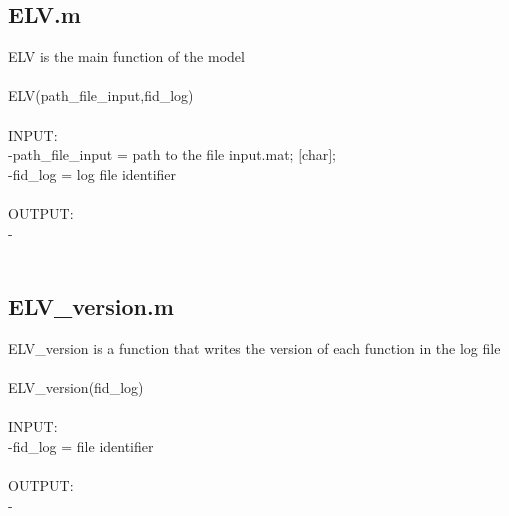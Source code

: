 \subsection{ELV.m}
ELV is the main function of the model \\ 
 \\ 
ELV(path\_file\_input,fid\_log) \\ 
 \\ 
INPUT: \\ 
   -path\_file\_input = path to the file input.mat; $[$char$]$;  \\ 
	-fid\_log = log file identifier \\ 
 \\ 
OUTPUT: \\ 
   - \\ 
 \\ 
\subsection{ELV\_version.m}
ELV\_version is a function that writes the version of each function in the log file \\ 
 \\ 
ELV\_version(fid\_log) \\ 
 \\ 
INPUT: \\ 
   -fid\_log = file identifier \\ 
 \\ 
OUTPUT: \\ 
   - \\ 
 \\ 
